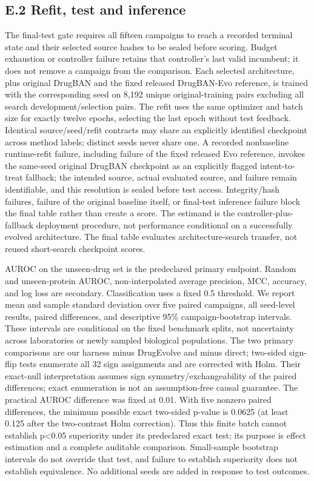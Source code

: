 \subsection*{E.2 Refit, test and inference}
The final-test gate requires all fifteen campaigns to reach a recorded terminal state and their selected source hashes to be sealed before scoring. Budget exhaustion or controller failure retains that controller's last valid incumbent; it does not remove a campaign from the comparison. Each selected architecture, plus original DrugBAN and the fixed released DrugBAN-Evo reference, is trained with the corresponding seed on 8,192 unique original-training pairs excluding all search development/selection pairs. The refit uses the same optimizer and batch size for exactly twelve epochs, selecting the last epoch without test feedback. Identical source/seed/refit contracts may share an explicitly identified checkpoint across method labels; distinct seeds never share one. A recorded nonbaseline runtime-refit failure, including failure of the fixed released Evo reference, invokes the same-seed original DrugBAN checkpoint as an explicitly flagged intent-to-treat fallback; the intended source, actual evaluated source, and failure remain identifiable, and this resolution is sealed before test access. Integrity/hash failures, failure of the original baseline itself, or final-test inference failure block the final table rather than create a score. The estimand is the controller-plus-fallback deployment procedure, not performance conditional on a successfully evolved architecture. The final table evaluates architecture-search transfer, not reused short-search checkpoint scores.

AUROC on the unseen-drug set is the predeclared primary endpoint. Random and unseen-protein AUROC, non-interpolated average precision, MCC, accuracy, and log loss are secondary. Classification uses a fixed 0.5 threshold. We report mean and sample standard deviation over five paired campaigns, all seed-level results, paired differences, and descriptive 95\% campaign-bootstrap intervals. These intervals are conditional on the fixed benchmark splits, not uncertainty across laboratories or newly sampled biological populations. The two primary comparisons are our harness minus DrugEvolve and minus direct; two-sided sign-flip tests enumerate all 32 sign assignments and are corrected with Holm. Their exact-null interpretation assumes sign symmetry/exchangeability of the paired differences; exact enumeration is not an assumption-free causal guarantee. The practical AUROC difference was fixed at 0.01. With five nonzero paired differences, the minimum possible exact two-sided p-value is 0.0625 (at least 0.125 after the two-contrast Holm correction). Thus this finite batch cannot establish p<0.05 superiority under its predeclared exact test; its purpose is effect estimation and a complete auditable comparison. Small-sample bootstrap intervals do not override that test, and failure to establish superiority does not establish equivalence. No additional seeds are added in response to test outcomes.
